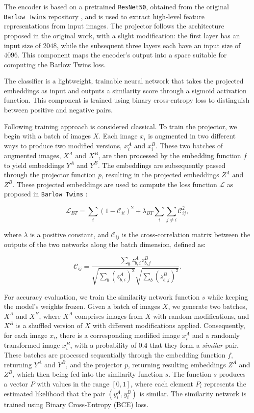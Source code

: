 \documentclass{article}
\begin{document}
The encoder is based on a pretrained \texttt{ResNet50}, obtained from the original \texttt{Barlow Twins} repository \cite{zbontar2021barlow}, and is used to extract high-level feature representations from input images. The projector follows the architecture proposed in the original work, with a slight modification: the first layer has an input size of $2048$, while the subsequent three layers each have an input size of $4096$. This component maps the encoder’s output into a space suitable for computing the Barlow Twins loss.

The classifier is a lightweight, trainable neural network that takes the projected embeddings as input and outputs a similarity score through a sigmoid activation function. This component is trained using binary cross-entropy loss to distinguish between positive and negative pairs.

Following training approach is considered classical. 
To train the projector, we begin with a batch of images $X$. Each image $x_i$ is 
augmented in two different ways to produce two modified versions, $x_i^A$ and $x_i^B$. 
These two batches of augmented images, $X^A$ and $X^B$, are then processed by the 
embedding function $f$ to yield embeddings $Y^A$ and $Y^B$. The embeddings are subsequently 
passed through the projector function $p$, resulting in the projected embeddings 
$Z^A$ and $Z^B$. These projected embeddings are used to compute the loss function 
$\mathcal{L}$ as proposed in \texttt{Barlow Twins} \cite{zbontar2021barlow}:

$$
\mathcal{L}_{BT} = \sum_i (1 - \mathcal{C}_{ii})^2 + \lambda_{BT} \sum_{i} \sum_{j \neq i} \mathcal{C}_{ij}^2,
$$

where $\lambda$ is a positive constant, and $\mathcal{C}_{ij}$ is the cross-correlation matrix between the outputs of the two networks along the batch dimension, defined as:

$$
\mathcal{C}_{ij} = \frac{\sum_b z_{b,i}^A z_{b,j}^B}{\sqrt{\sum_b (z_{b,i}^A)^2} \sqrt{\sum_b (z_{b,j}^B)^2}}.
$$

For accuracy evaluation, we train the similarity network function $s$ while keeping the 
model's weights frozen. Given a batch of images $X$, we generate two batches, 
$X^A$ and $X^B$, where $X^A$ comprises images from $X$ with random modifications, 
and $X^B$ is a shuffled version of $X$ with different modifications applied. 
Consequently, for each image $x_i$, there is a corresponding modified image $x_i^A$ 
and a randomly transformed image $x_i^B$, with a probability of $0.4$ that they form a 
\textit{similar} pair. These batches are processed sequentially through the embedding 
function $f$, returning $Y^A$ and $Y^B$, and the projector $p$, returning resulting embeddings $Z^A$ and $Z^B$, which then being
fed into the similarity function $s$. The function $s$ produces a vector $P$ with values 
in the range $[0,1]$, where each element $P_i$ represents the estimated likelihood that the 
pair $(y_i^A, y_i^B)$ is similar. The similarity network is trained using 
Binary Cross-Entropy (BCE) loss.
\end{document}
